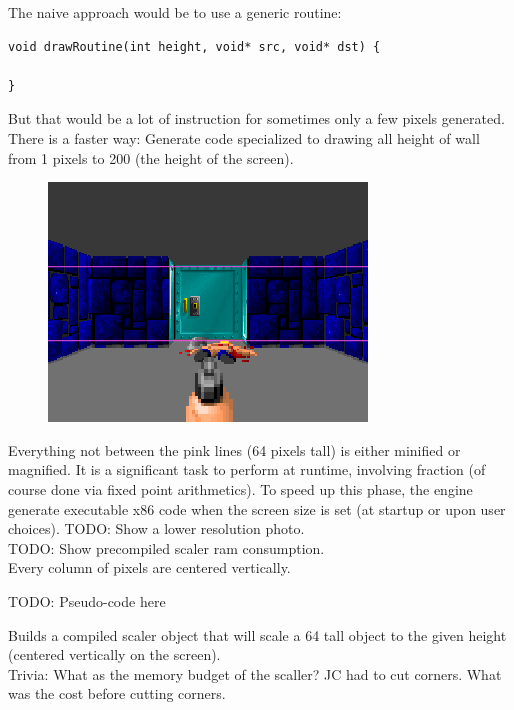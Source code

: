 The naive approach would be to use a generic routine:\\
\begin{verbatim}
void drawRoutine(int height, void* src, void* dst) {
  
}
\end{verbatim}
\par
But that would be a lot of instruction for sometimes only a few pixels generated. There is a faster way: Generate code specialized to drawing all height of wall from 1 pixels to 200 (the height of the screen).\\
\par
 \begin{figure}[H]
\centering
 \includegraphics[width=\textwidth]{screenshots/scaling_walls.png}
 \end{figure}
\par
Everything not between the pink lines (64 pixels tall) is either minified or magnified. It is a significant task to perform at runtime, involving fraction (of course done via fixed point arithmetics). To speed up this phase, the engine generate executable x86 code when the screen size is set (at startup or upon user choices).
TODO: Show a lower resolution photo.\\
TODO: Show precompiled scaler ram consumption.\\
Every column of pixels are centered vertically.



TODO: Pseudo-code here\\
\par
Builds a compiled scaler object that will scale a 64 tall object to the given height (centered vertically on the screen).
\\
Trivia: What as the memory budget of the scaller? JC had to cut corners. What was the cost before cutting corners.\\
\par
\begin{minipage}{\textwidth}

\end{minipage}

